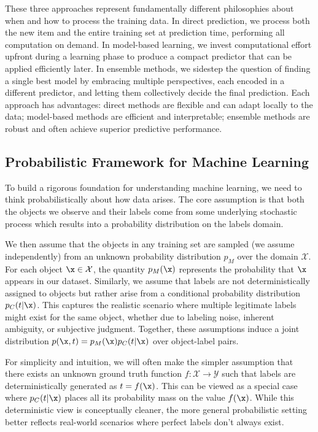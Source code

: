 
These three approaches represent fundamentally different philosophies about when and how to process the training data. In direct prediction, we process both the new item and the entire training set at prediction time, performing all computation on demand. In model-based learning, we invest computational effort upfront during a learning phase to produce a compact predictor that can be applied efficiently later. In ensemble methods, we sidestep the question of finding a single best model by embracing multiple perspectives, each encoded in a different predictor, and letting them collectively decide the final prediction. Each approach has advantages: direct methods are flexible and can adapt locally to the data; model-based methods are efficient and interpretable; ensemble methods are robust and often achieve superior predictive performance.

\subsection*{Probabilistic Framework for Machine Learning}

To build a rigorous foundation for understanding machine learning, we need to think probabilistically about how data arises. The core assumption is that both the objects we observe and their labels come from some underlying stochastic process which results into a probability distribution on the labels domain.

We then assume that the objects in any training set are sampled (we assume independently) from an unknown probability distribution $p_M$ over the domain $\mathcal{X}$. For each object $\x \in \mathcal{X}$, the quantity $p_M(\x)$ represents the probability that $\x$ appears in our dataset. Similarly, we assume that labels are not deterministically assigned to objects but rather arise from a conditional probability distribution $p_C(t|\x)$. This captures the realistic scenario where multiple legitimate labels might exist for the same object, whether due to labeling noise, inherent ambiguity, or subjective judgment. Together, these assumptions induce a joint distribution $p(\x, t) = p_M(\x) p_C(t|\x)$ over object-label pairs.

For simplicity and intuition, we will often make the simpler assumption that there exists an unknown \alert{ground truth function} $f: \mathcal{X} \to \mathcal{Y}$ such that labels are deterministically generated as $t = f(\x)$. This can be viewed as a special case where $p_C(t|\x)$ places all its probability mass on the value $f(\x)$. While this deterministic view is  conceptually cleaner, the more general probabilistic setting better reflects real-world scenarios where perfect labels don't always exist.

